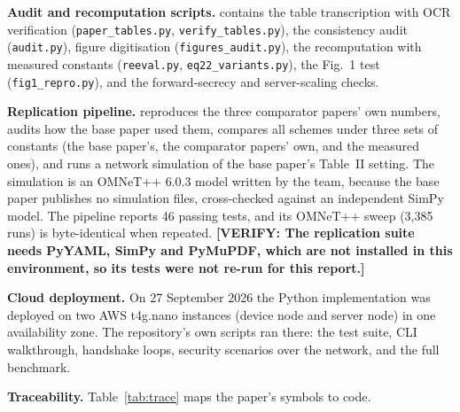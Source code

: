 \documentclass[12pt,a4paper,oneside]{report}
\numberwithin{equation}{chapter}
\newcommand{\VERIFY}[1]{\textcolor{orange!85!black}{\textbf{[VERIFY: #1]}}}
\begin{document}
\textbf{Audit and recomputation scripts.}  contains the table transcription with OCR verification (\texttt{paper\_tables.py}, \texttt{verify\_tables.py}), the consistency audit (\texttt{audit.py}), figure digitisation (\texttt{figures\_audit.py}), the recomputation with measured constants (\texttt{reeval.py}, \texttt{eq22\_variants.py}), the Fig.~1 test (\texttt{fig1\_repro.py}), and the forward-secrecy and server-scaling checks.

\textbf{Replication pipeline.}  reproduces the three comparator papers' own numbers, audits how the base paper used them, compares all schemes under three sets of constants (the base paper's, the comparator papers' own, and the measured ones), and runs a network simulation of the base paper's Table~II setting. The simulation is an OMNeT++ 6.0.3 \cite{omnetpp} model written by the team, because the base paper publishes no simulation files, cross-checked against an independent SimPy model. The pipeline reports 46 passing tests, and its OMNeT++ sweep (3{,}385 runs) is byte-identical when repeated. \VERIFY{The replication suite needs PyYAML, SimPy and PyMuPDF, which are not installed in this environment, so its tests were not re-run for this report.}

\textbf{Cloud deployment.} On 27 September 2026 the Python implementation was deployed on two AWS t4g.nano instances (device node and server node) in one availability zone. The repository's own scripts ran there: the test suite, CLI walkthrough, handshake loops, security scenarios over the network, and the full benchmark.

\textbf{Traceability.} Table~\ref{tab:trace} maps the paper's symbols to code.
\end{document}
